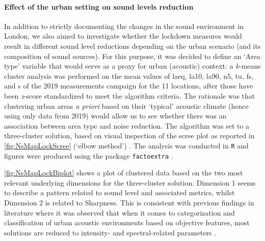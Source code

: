 \paragraph*{Effect of the urban setting on sound levels reduction}

In addition to strictly documenting the changes in the sound environment in London, we also aimed to investigate whether the lockdown measures would result in different sound level reductions depending on the urban scenario (and its composition of sound sources). For this purpose, it was decided to define an `Area type' variable that would serve as a proxy for urban (acoustic) context: a \emph{k}-means cluster analysis was performed on the mean values of \gls{laeq}, \gls{la10}, \gls{la90}, \gls{n5}, \gls{tu}, \gls{fs}, and \gls{s} of the 2019 measurements campaign for the 11 locations, after those have been \emph{z}-score standardized to meet the algorithm criteria. The rationale was that clustering urban areas \emph{a priori} based on their `typical' acoustic climate (hence using only data from 2019) would allow us to see whether there was an association between area type and noise reduction. The algorithm was set to a three-cluster solution, based on visual inspection of the scree plot as reported in \cref{fig:NsMapLockScree} (`elbow method') \citep{KetchenJr.1996application}. The analysis was conducted in \texttt{R} \citep{RCT2018R} and figures were produced using the package \texttt{factoextra} \citep{Kassambara2020factoextra}.


\cref{fig:NsMapLockBiplot} shows a plot of clustered data based on the two most relevant underlying dimensions for the three-cluster solution. Dimension 1 seems to describe a pattern related to sound level and associated metrics, whilst Dimension 2 is related to Sharpness. This is consistent with previous findings in literature where it was observed that when it comes to categorization and classification of urban acoustic environments based on objective features, most solutions are reduced to intensity- and spectral-related parameters \citep{deCoensel2006quiet,Aletta2017Dimensions}.


